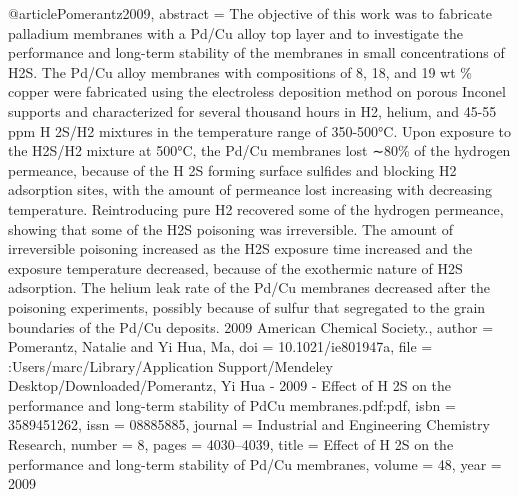 @article{Pomerantz2009,
abstract = {The objective of this work was to fabricate palladium membranes with a Pd/Cu alloy top layer and to investigate the performance and long-term stability of the membranes in small concentrations of H2S. The Pd/Cu alloy membranes with compositions of 8, 18, and 19 wt {\%} copper were fabricated using the electroless deposition method on porous Inconel supports and characterized for several thousand hours in H2, helium, and 45-55 ppm H 2S/H2 mixtures in the temperature range of 350-500°C. Upon exposure to the H2S/H2 mixture at 500°C, the Pd/Cu membranes lost ∼80{\%} of the hydrogen permeance, because of the H 2S forming surface sulfides and blocking H2 adsorption sites, with the amount of permeance lost increasing with decreasing temperature. Reintroducing pure H2 recovered some of the hydrogen permeance, showing that some of the H2S poisoning was irreversible. The amount of irreversible poisoning increased as the H2S exposure time increased and the exposure temperature decreased, because of the exothermic nature of H2S adsorption. The helium leak rate of the Pd/Cu membranes decreased after the poisoning experiments, possibly because of sulfur that segregated to the grain boundaries of the Pd/Cu deposits. {\textcopyright} 2009 American Chemical Society.},
author = {Pomerantz, Natalie and {Yi Hua}, Ma},
doi = {10.1021/ie801947a},
file = {:Users/marc/Library/Application Support/Mendeley Desktop/Downloaded/Pomerantz, Yi Hua - 2009 - Effect of H 2S on the performance and long-term stability of PdCu membranes.pdf:pdf},
isbn = {3589451262},
issn = {08885885},
journal = {Industrial and Engineering Chemistry Research},
number = {8},
pages = {4030--4039},
title = {{Effect of H 2S on the performance and long-term stability of Pd/Cu membranes}},
volume = {48},
year = {2009}
}
